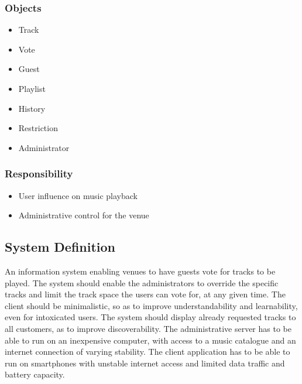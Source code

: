 \subsubsection{Objects}
\begin{itemize}
    \item Track
    \item Vote
    \item Guest
    \item Playlist
		\item History
    \item Restriction
    \item Administrator
\end{itemize}

\subsubsection{Responsibility}
\begin{itemize}
    \item User influence on music playback
    \item Administrative control for the venue
\end{itemize}

\subsection{System Definition}
An information system enabling venues to have guests vote for tracks to be played. The system should enable the administrators to override the specific tracks and limit the track space the users can vote for, at any given time. The client should be minimalistic, so as to improve understandability and learnability, even for intoxicated users. The system should display already requested tracks to all customers, as to improve discoverability.
The administrative server has to be able to run on an inexpensive computer, with access to a music catalogue and an internet connection of varying stability. The client application has to be able to run on smartphones with unstable internet access and limited data traffic and battery capacity.